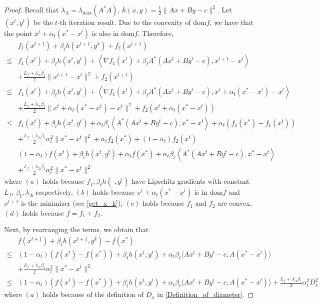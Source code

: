 \documentclass{article}
\numberwithin{equation}{section}
\begin{document}
\begin{proof}
    Recall that $\lambda_{A} = \lambda_{\max}(A^*A)$, $h(x,y) =\frac{1}{2}\|Ax+By-c\rVert^2$.  
    Let $(x^t,y^t)$ be the $t$-th iteration result. Due to the convexity of $\mathrm{dom}f$, 
    we have that the point $x^t + \alpha_t(x^*-x^t)$ is also in $\mathrm{dom}f$.   
    Therefore, 
    \begin{align}
        &f_1(x^{t+1})+ \beta_{t}h(x^{t+1},y^k) +f_2(x^{t+1})  \nonumber \\
        \overset{\mathop{(a)}}{\leq}& f_1(x^t) +\beta_{t}h(x^t,y^t) +\left\langle \nabla f_1(x^t)+\beta_{t}A^*(Ax^t+By^t-c), x^{t+1} -x^t\right\rangle   \nonumber \\
        & + \frac{L_f+\lambda_{A} \beta_{t}}{2}\|x^{t+1} - x^{t}\rVert^2 +f_2(x^{t+1}) \nonumber \\
        \overset{\mathop{(b)}}{\leq}& f_1(x^t) +\beta_{t}h(x^t,y^t) +\left\langle \nabla f_1(x^t)+\beta_{t}A^*(Ax^t+By^t-c), x^t+\alpha_t(x^*-x^t) -x^t\right\rangle \nonumber \\
        &+ \frac{L_f+\lambda_{A} \beta_{t}}{2}\|x^t+\alpha_t(x^*-x^t) -x^t\rVert^2 +f_2\left(x^t+\alpha_t(x^*-x^t) \right)  \nonumber \\
        \overset{\mathop{(c)}}{\leq}& f_1(x^t) +\beta_{t}h(x^t,y^t) +\alpha_t\beta_{t}\left\langle  A^*(Ax^t+By^t-c), x^* -x^t\right\rangle+ \alpha_t\left( f_1(x^*)-f_1(x^t)\right)  \nonumber\\
        &+ \frac{L_f+\lambda_{A} \beta_{t}}{2}\alpha_t^2\|x^* - x^{t}\rVert^2 + \alpha_t f_2(x^*) +(1-\alpha_t)f_2(x^t)  \nonumber \\
        \overset{\mathop{(d)}}{=}& (1-\alpha_t)f(x^t) +\beta_{t}h(x^t,y^t) +\alpha_t f(x^*)+\alpha_t\beta_{t}\left\langle  A^*(Ax^t+By^t-c), x^* -x^t\right\rangle \nonumber \\
        &+ \frac{L_f+\lambda_{A} \beta_{t}}{2}\alpha_t^2\|x^* - x^{t}\rVert^2
        \label{f_1_poposition_1}
    \end{align}
    where $(a)$ holds because $f_1,\beta_th(\cdot,y^t)$ have Lipschitz gradients with constant $L_f$, $\beta_t, \lambda_{A}$ respectively, $(b)$ holds because $x^t+\alpha_t(x^*-x^t)$ is in $\mathrm{dom}f$ and $x^{t+1}$ 
    is the minimizer (see \eqref{get_x_k}), $(c)$ holds because $f_1$ and $f_2$ are convex, 
    $(d)$ holds because $f=f_1+f_2$. 

    Next, by rearranging the terms, we obtain that 
    \begin{align}
         &f(x^{t+1})+ \beta_{t}h(x^{t+1},y^k) -f(x^*) \nonumber \\
         \leq& (1-\alpha_t)\left(f(x^t) -f(x^*)\right) +\beta_{t}h(x^t,y^t)+\alpha_t\beta_{t}\langle Ax^t+By^t-c,A(x^*-x^t)\rangle \nonumber\\
         &+\frac{L_f+\lambda_{A} \beta_{t}}{2}\alpha_t^2\|x^* - x^{t}\rVert^2 \nonumber \\
         \overset{\mathop{(a)}}{\leq}& (1-\alpha_t)\left(f(x^t) -f(x^*)\right) +\beta_{t}h(x^t,y^t)+\alpha_t\beta_{t}\langle Ax^t+By^t-c,A(x^*-x^t)\rangle +\frac{L_f+\lambda_{A} \beta_{t}}{2}\alpha_t^2D_x^2 \label{f_k+1}
    \end{align}
    where $(a)$ holds because of the definition of $D_x$ in \eqref{Definition_of_diameter}.


\end{proof}
\end{document}
